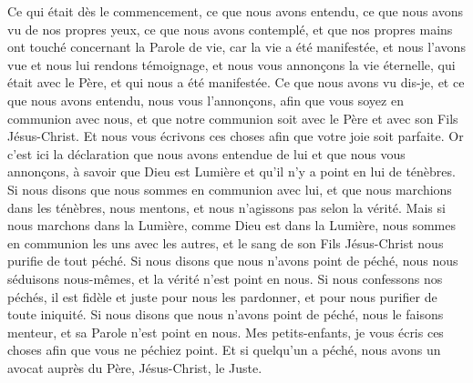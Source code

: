 \begin{multicols}{2}
\VerseOne{}Ce qui était dès le commencement, ce que nous avons entendu, ce que nous avons vu de nos propres yeux, ce que nous avons contemplé, et que nos propres mains ont touché concernant la Parole de vie,
car la vie a été manifestée, et nous l'avons vue et nous lui rendons témoignage, et nous vous annonçons la vie éternelle, qui était avec le Père, et qui nous a été manifestée.
Ce que nous avons vu dis-je, et ce que nous avons entendu, nous vous l'annonçons, afin que vous soyez en communion avec nous, et que notre communion soit avec le Père et avec son Fils Jésus-Christ.
Et nous vous écrivons ces choses afin que votre joie soit parfaite.
Or c'est ici la déclaration que nous avons entendue de lui et que nous vous annonçons, à savoir que Dieu est Lumière et qu'il n'y a point en lui de ténèbres.
Si nous disons que nous sommes en communion avec lui, et que nous marchions dans les ténèbres, nous mentons, et nous n'agissons pas selon la vérité.
Mais si nous marchons dans la Lumière, comme Dieu est dans la Lumière, nous sommes en communion les uns avec les autres, et le sang de son Fils Jésus-Christ nous purifie de tout péché.
Si nous disons que nous n'avons point de péché, nous nous séduisons nous-mêmes, et la vérité n'est point en nous.
Si nous confessons nos péchés, il est fidèle et juste pour nous les pardonner, et pour nous purifier de toute iniquité.
Si nous disons que nous n'avons point de péché, nous le faisons menteur, et sa Parole n'est point en nous.
\VerseOne{}Mes petits-enfants, je vous écris ces choses afin que vous ne péchiez point. Et si quelqu'un a péché, nous avons un avocat auprès du Père, Jésus-Christ, le Juste.

\end{multicols}
